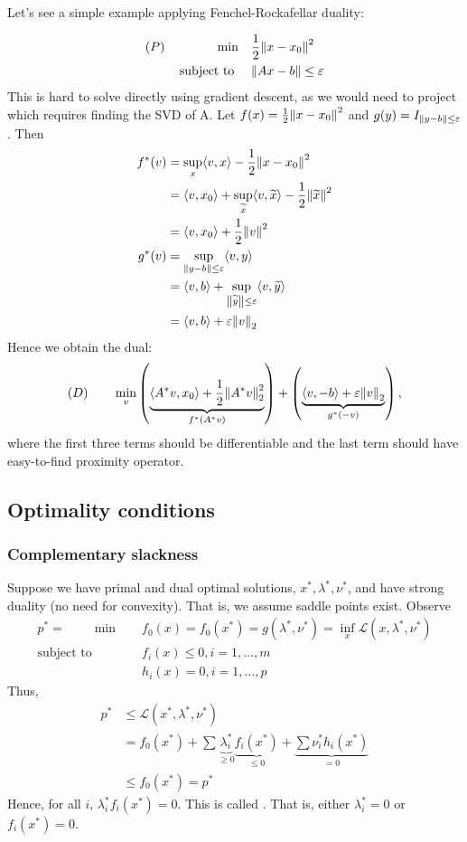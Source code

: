 \documentclass[class=article,crop=false]{standalone}
\begin{document}
Let's see a simple example applying Fenchel-Rockafellar duality:
\begin{eg}
\begin{align*}
	(P) \qquad \qquad \min\quad & \frac{1}{2} {\left\lVert{ x-x_0}\right\rVert}^2  \\
\text{subject to } \quad &{\left\lVert{ Ax-b}\right\rVert}\leq \varepsilon  
\end{align*}
This is hard to solve directly using gradient descent, as we would need to project which requires finding the SVD of A.
Let $ f(x) = \frac{1}{2} {\left\lVert{ x-x_0}\right\rVert}^2 $ and $ g(y) = I_{{\left\lVert{ y-b}\right\rVert}\leq \varepsilon }$. Then
\begin{align*}
	f^* (v) &= \sup_x \langle v,x \rangle-\frac{1}{2}{\left\lVert{ x-x_0}\right\rVert} ^2\\
	&= \langle v,x_0 \rangle+ \sup_{\widetilde{ x}} \langle v,\widetilde{ x} \rangle -\frac{1}{2} {\left\lVert{ \widetilde{ x}}\right\rVert}^2  \\
	&= \langle v,x_0 \rangle + \frac{1}{2} {\left\lVert{ v}\right\rVert}^2  \\
	g^* (v) &= \sup_{{\left\lVert{ y-b}\right\rVert}\leq \varepsilon } \langle v,y \rangle \\
	&= \langle v,b \rangle+ \sup_{ {\left\lVert{ \widetilde{ y}}\right\rVert}\leq \varepsilon } \langle v,\widetilde{ y} \rangle \\
	&= \langle v,b \rangle + \varepsilon {\left\lVert{ v}\right\rVert}_2  
\end{align*}
Hence we obtain the dual:
\[
	(D) \qquad \min_v \left( \underbrace{ \langle A^* v,x_0 \rangle + \frac{1}{2} {\left\lVert{ A^* v}\right\rVert}_2^2 }_{f^* (A^* v) } \right) + \left( \underbrace{ \langle v,-b \rangle +  \varepsilon {\left\lVert{ v}\right\rVert}_2 }_{ g^* (-v)} \right)   
,\]
where the first three terms should be differentiable and the last term should have easy-to-find proximity operator.
\end{eg}

\subsection{Optimality conditions}
\subsubsection{Complementary slackness}
Suppose we have primal and dual optimal solutions, $ x^* ,\lambda^* ,\nu^* $, and have strong duality (no need for convexity). That is, we assume saddle points exist. Observe
\begin{align*}
	p^* =\qquad \min\quad &f_0(x) = f_0(x^* ) = g(\lambda^* ,\nu^* ) = \inf_x \mathscr{L}(x,\lambda^* ,\nu^* )\\
\text{subject to } \quad &f_i(x) \leq 0, i = 1,\ldots,m \\
&h_i(x) = 0 , i = 1,\ldots,p
\end{align*}
Thus,
\begin{align*}
	p^* &\leq \mathscr{L}(x^* ,\lambda^* ,\nu^* )\\
	    &= f_0(x^* )+ \sum \underbrace{ \lambda_i^*}_{\geq 0} \underbrace{f_i(x^* )}_{\leq 0} + \underbrace{ \sum \nu_i^* h_i(x^* )}_{=0} \\
	    &\leq f_0 (x^* ) = p^*   
\end{align*}
Hence, for all $ i$,  $ \lambda_i^* f_i(x^* ) = 0$. This is called . That is, either $ \lambda_i^* =0$ or $ f_i(x^* ) = 0$.
\end{document}
